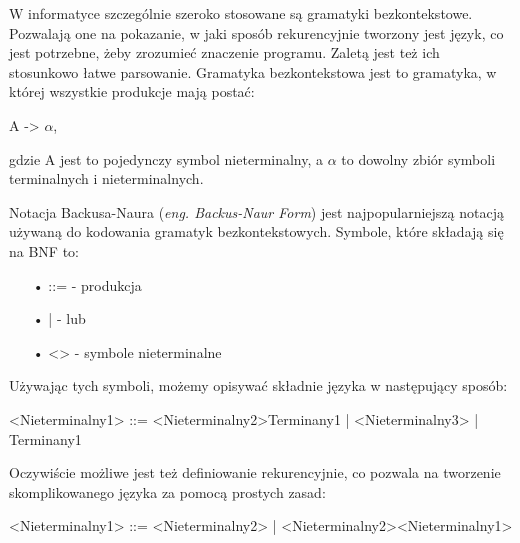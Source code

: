 W informatyce szczególnie szeroko stosowane są gramatyki bezkontekstowe. Pozwalają one na pokazanie, w jaki sposób rekurencyjnie tworzony jest język, co jest potrzebne, żeby zrozumieć znaczenie programu. Zaletą jest też ich stosunkowo łatwe parsowanie.
Gramatyka bezkontekstowa jest to gramatyka, w której wszystkie produkcje mają postać:
\begin{center}
	A -> {$\alpha$},
\end{center}
gdzie A jest to pojedynczy symbol nieterminalny, a $\alpha$ to dowolny zbiór symboli terminalnych i nieterminalnych.
	
Notacja Backusa-Naura (\textit{eng. Backus-Naur Form}) \cite{Backus1959TheSA}\cite{Naur}\cite{Knuth1964} jest najpopularniejszą notacją używaną do kodowania gramatyk bezkontekstowych. Symbole, które składają się na BNF to:

\begin{itemize}
  \item[•] ::= - produkcja
  \item[•] |   - lub
  \item[•] <>  - symbole nieterminalne
\end{itemize}

Używając tych symboli, możemy opisywać składnie języka w następujący sposób:
\begin{center}
<Nieterminalny1> ::= <Nieterminalny2>Terminany1 | <Nieterminalny3> | Terminany1
\end{center}
Oczywiście możliwe jest też definiowanie rekurencyjnie, co pozwala na tworzenie skomplikowanego języka za pomocą prostych zasad: 
\begin{center}
<Nieterminalny1> ::= <Nieterminalny2> | <Nieterminalny2><Nieterminalny1>
\end{center}


